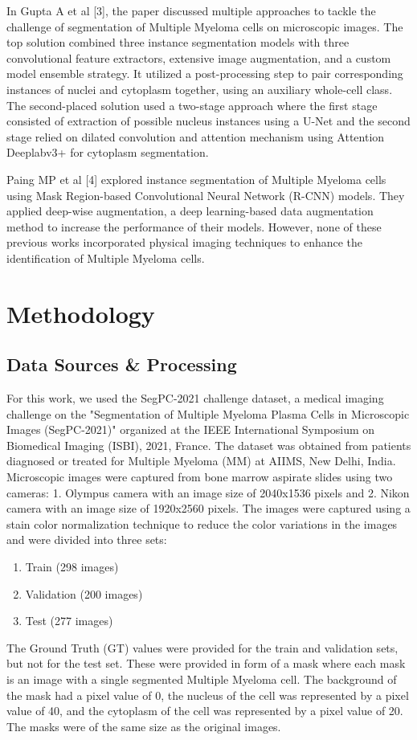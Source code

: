 \documentclass{article}
\begin{document}
In Gupta A et al [3], the paper discussed multiple approaches to tackle the challenge of segmentation of Multiple Myeloma cells on microscopic images. The top solution combined three instance segmentation models with three convolutional feature extractors, extensive image augmentation, and a custom model ensemble strategy. It utilized a post-processing step to pair corresponding instances of nuclei and cytoplasm together, using an auxiliary whole-cell class. The second-placed solution used a two-stage approach where the first stage consisted of extraction of possible nucleus instances using a U-Net and the second stage relied on dilated convolution and attention mechanism using Attention Deeplabv3+ for cytoplasm segmentation.

Paing MP et al [4] explored instance segmentation of Multiple Myeloma cells using Mask Region-based Convolutional Neural Network (R-CNN) models. They applied deep-wise augmentation, a deep learning-based data augmentation method to increase the performance of their models. However, none of these previous works incorporated physical imaging techniques to enhance the identification of Multiple Myeloma cells.

\section{Methodology}
\subsection{Data Sources \& Processing}
For this work, we used the SegPC-2021 challenge dataset, a medical imaging challenge on the "Segmentation of Multiple Myeloma Plasma Cells in Microscopic Images (SegPC-2021)" organized at the IEEE International Symposium on Biomedical Imaging (ISBI), 2021, France. The dataset was obtained from patients diagnosed or treated for Multiple Myeloma (MM) at AIIMS, New Delhi, India. Microscopic images were captured from bone marrow aspirate slides using two cameras: 1. Olympus camera with an image size of 2040x1536 pixels and 2. Nikon camera with an image size of 1920x2560 pixels. The images were captured using a stain color normalization technique to reduce the color variations in the images and were divided into three sets:
\begin{enumerate}
  \item Train (298 images)
  \item Validation (200 images)
  \item Test (277 images)
\end{enumerate}
The Ground Truth (GT) values were provided for the train and validation sets, but not for the test set. These were provided in form of a mask where each mask is an image with a single segmented Multiple Myeloma cell. The background of the mask had a pixel value of 0, the nucleus of the cell was represented by a pixel value of 40, and the cytoplasm of the cell was represented by a pixel value of 20. The masks were of the same size as the original images.
\end{document}
